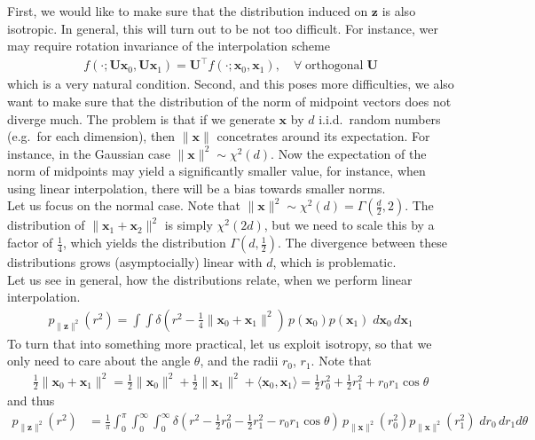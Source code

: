 \documentclass{article}
\newcommand{\x}{{\mathbf x}}
\newcommand{\z}{{\mathbf z}}
\newcommand{\U}{{\mathbf U}}
\begin{document}
\newpage


First, we would like to make sure that the distribution induced on $\z$ is also isotropic. In general, this will turn out to be not too difficult. For instance, wer may require rotation invariance of the interpolation scheme 
\begin{align}
f(\cdot; \U \x_0,\U \x_1) = \mathbf U^\top f(\cdot; \x_0,\x_1), \quad \forall \; \text{orthogonal} \; \U 
\end{align}
which is a very natural condition. Second, and this poses more difficulties, we also want to make sure that the distribution of the norm of midpoint vectors does not diverge much. The problem is that if we generate $\x$ by $d$ i.i.d.~random numbers (e.g.~for each dimension), then $\| \x\|$ concetrates around its expectation. For instance, in the Gaussian case $\|\x\|^2 \sim \chi^2(d)$. Now the expectation of the norm of midpoints may yield a significantly smaller value, for instance, when using linear interpolation, there will be a bias towards smaller norms.\\ 

\noindent Let us focus on the normal case. Note that $\|\x\|^2 \sim \chi^2(d) = \Gamma(\frac d2,2)$. The distribution of $\| \x_1 + \x_2\|^2$ is simply $\chi^2(2d)$, but we need to scale this by a factor of $\tfrac 14$, which yields the distribution $\Gamma(d,\frac 12)$. The divergence between these distributions grows (asymptocially) linear with $d$, which is problematic. \\

\noindent Let us see in general, how the distributions relate, when we perform linear interpolation. 
\begin{align}
p_{\|\z\|^2}(r^2) = \int \int \delta\left(r^2 - \frac14 \| \x_0 + \x_1\|^2 \right) \, p(\x_0) p(\x_1) \; d\x_0 \, d\x_1
\end{align}
To turn that into something more practical, let us exploit isotropy, so that we only need to care about the angle $\theta$, and the radii $r_0$, $r_1$. Note that 
\begin{align}
\frac 12 \| \x_0 + \x_1\|^2 = \frac 12 \| \x_0\|^2 + \frac 12 \| \x_1\|^2 + \langle \x_0, \x_1 \rangle = \frac 12 r_0^2 + \frac12 r_1^2 + r_0 r_1 \cos \theta
\end{align}
and thus
\begin{align}
p_{\|\z\|^2}(r^2) & = \frac 1 \pi \int_{0}^\pi \int_0^\infty \int_0^\infty \delta\left(r^2 - \frac 12 r_0^2 -\frac 12 r_1^2 -  r_0 r_1 \cos \theta \right)\, p_{\|\x\|^2}(r_0^2) p_{\|\x\|^2} (r_1^2) \; dr_0 \, dr_1 d\theta
\end{align}
\end{document}
